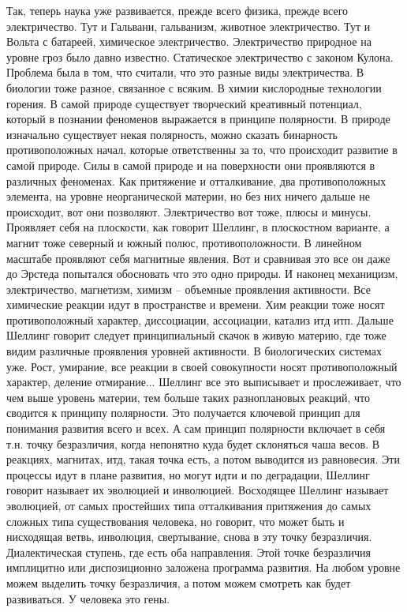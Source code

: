 \documentclass[a4paper, 12pt]{article}
\begin{document}
Так, теперь наука уже развивается, прежде всего физика, прежде всего 
электричество. Тут и Гальвани, гальванизм, животное электричество. Тут 
и Вольта с батареей, химическое электричество. Электричество природное 
на уровне гроз было давно известно. Статическое электричество с законом 
Кулона. Проблема была в том, что считали, что это разные виды 
электричества. В биологии тоже разное, связанное с всяким. В химии 
кислородные технологии горения. В самой природе существует творческий 
креативный потенциал, который в познании феноменов выражается в принципе 
полярности. В природе изначально существует некая полярность, можно 
сказать бинарность противоположных начал, которые ответственны за то, 
что происходит развитие в самой природе. Силы в самой природе и на 
поверхности они проявляются в различных феноменах. Как притяжение 
и отталкивание, два противоположных элемента, на уровне неорганической 
материи, но без них ничего дальше не происходит, вот они позволяют. 
Электричество вот тоже, плюсы и минусы. Проявляет себя на плоскости, как 
говорит Шеллинг, в плоскостном варианте, а магнит тоже северный и южный 
полюс, противоположности. В линейном масштабе проявляют себя магнитные 
явления. Вот и сравнивая это все он даже до Эрстеда попытался обосновать 
что это одно природы. И наконец механицизм, электричество, магнетизм, 
химизм -- объемные проявления активности. Все химические реакции идут 
в пространстве и времени. Хим реакции тоже носят противоположный 
характер, диссоциации, ассоциации, катализ итд итп. Дальше Шеллинг 
говорит следует принципиальный скачок в живую материю, где тоже видим 
различные проявления уровней активности. В биологических системах уже. 
Рост, умирание, все реакции в своей совокупности носят противоположный 
характер, деление отмирание... Шеллинг все это выписывает 
и прослеживает, что чем выше уровень материи, тем больше таких 
разноплановых реакций, что сводится к принципу полярности. Это 
получается ключевой принцип для понимания развития всего и всех. А сам 
принцип полярности включает в себя т.н. точку безразличия, когда 
непонятно куда будет склоняться чаша весов. В реакциях, магнитах, итд, 
такая точка есть, а потом выводится из равновесия. Эти процессы идут 
в плане развития, но могут идти и по деградации, Шеллинг говорит 
называет их эволюцией и инволюцией. Восходящее Шеллинг называет 
эволюцией, от самых простейших типа отталкивания притяжения до самых 
сложных типа существования человека, но говорит, что может быть 
и нисходящая ветвь, инволюция, свертывание, снова в эту точку 
безразличия. Диалектическая ступень, где есть оба направления. Этой 
точке безразличия имплицитно или диспозиционно заложена программа 
развития. На любом уровне можем выделить точку безразличия, а потом 
можем смотреть как будет развиваться. У человека это гены.
\end{document}

